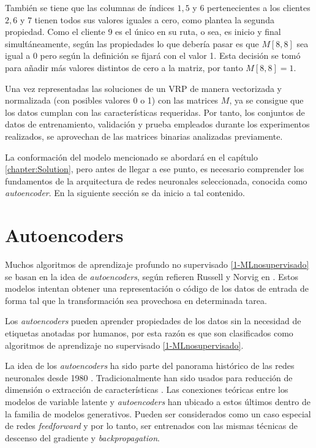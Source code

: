  
  También se tiene que las columnas de índices $1, 5$ y  $6$ pertenecientes a los clientes $2, 6$ y $7$ tienen todos sus valores iguales a cero, como plantea la segunda propiedad. Como el cliente 9 es el único en su ruta, o sea, es inicio y final simultáneamente, según las propiedades lo que debería pasar es que $M[8, 8]$ sea igual a $0$ pero según la definición se fijará con el valor 1. Esta decisión se tomó  para añadir más valores distintos de cero a la matriz, por tanto $M[8, 8] = 1$. 
  
  Una vez representadas las soluciones de un VRP de manera vectorizada y normalizada (con posibles valores 0 o 1) con las matrices $M$, ya se consigue que los datos cumplan con las características requeridas. Por tanto, los conjuntos de datos de entrenamiento, validación y prueba empleados durante los experimentos realizados, se aprovechan de las matrices binarias analizadas previamente.
  
  La conformación del modelo mencionado se abordará en el capítulo \ref{chapter:Solution}, pero antes de llegar a ese punto, es necesario comprender los fundamentos de la arquitectura de redes neuronales seleccionada, conocida como \textit{autoencoder}. En la siguiente sección se da inicio a tal contenido.
 
 
 
\section{Autoencoders}\label{2-AEC}

Muchos algoritmos de aprendizaje profundo no supervisado \ref{1-MLnosupervisado} se basan en la idea de \textit{autoencoders}, según refieren Russell y Norvig en \cite{PeterNorvig} . Estos modelos intentan obtener una representación o código de los datos de entrada de forma tal que la transformación sea provechosa en determinada tarea.

Los \textit{autoencoders} pueden aprender propiedades de los datos sin la necesidad de etiquetas anotadas por humanos, por esta razón es que son clasificados como algoritmos de aprendizaje no supervisado \ref{1-MLnosupervisado}. 

La idea de los \textit{autoencoders} ha sido parte del panorama histórico de las redes neuronales desde 1980 \cite{LeCun1987, HintonAutoencoders}. Tradicionalmente han sido usados para reducción de dimensión o extracción de características \cite{autoencoders2020, VAESurveyAplications}. Las conexiones teóricas entre los modelos de variable latente y \textit{autoencoders} han ubicado a estos últimos dentro de la familia de modelos generativos. Pueden ser considerados como un caso especial de redes \textit{feedforward} y por lo tanto, ser entrenados con las mismas técnicas de descenso del gradiente y \textit{backpropagation}.

